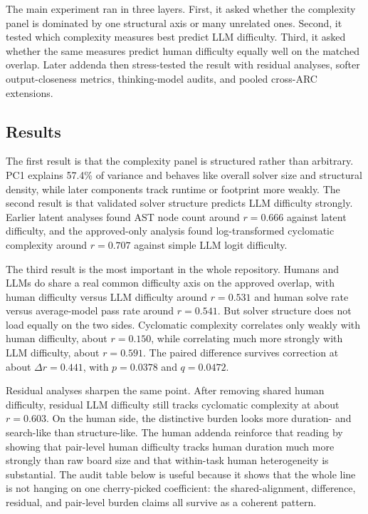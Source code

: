 The main experiment ran in three layers. First, it asked whether the complexity panel is dominated by one structural axis or many unrelated ones. Second, it tested which complexity measures best predict LLM difficulty. Third, it asked whether the same measures predict human difficulty equally well on the matched overlap. Later addenda then stress-tested the result with residual analyses, softer output-closeness metrics, thinking-model audits, and pooled cross-ARC extensions.

\subsection{Results}

The first result is that the complexity panel is structured rather than arbitrary. PC1 explains 57.4\% of variance and behaves like overall solver size and structural density, while later components track runtime or footprint more weakly. The second result is that validated solver structure predicts LLM difficulty strongly. Earlier latent analyses found AST node count around $r = 0.666$ against latent difficulty, and the approved-only analysis found log-transformed cyclomatic complexity around $r = 0.707$ against simple LLM logit difficulty.

The third result is the most important in the whole repository. Humans and LLMs do share a real common difficulty axis on the approved overlap, with human difficulty versus LLM difficulty around $r = 0.531$ and human solve rate versus average-model pass rate around $r = 0.541$. But solver structure does not load equally on the two sides. Cyclomatic complexity correlates only weakly with human difficulty, about $r = 0.150$, while correlating much more strongly with LLM difficulty, about $r = 0.591$. The paired difference survives correction at about $\Delta r = 0.441$, with $p = 0.0378$ and $q = 0.0472$.

Residual analyses sharpen the same point. After removing shared human difficulty, residual LLM difficulty still tracks cyclomatic complexity at about $r = 0.603$. On the human side, the distinctive burden looks more duration- and search-like than structure-like. The human addenda reinforce that reading by showing that pair-level human difficulty tracks human duration much more strongly than raw board size and that within-task human heterogeneity is substantial. The audit table below is useful because it shows that the whole line is not hanging on one cherry-picked coefficient: the shared-alignment, difference, residual, and pair-level burden claims all survive as a coherent pattern.

